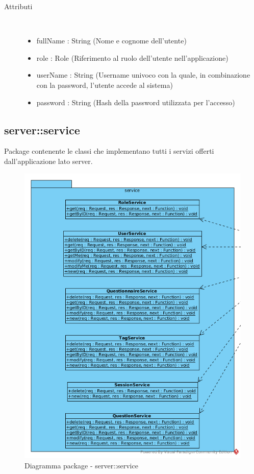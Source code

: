 \begin{description}
\item[Attributi] \hfill \\
 \vspace{-7mm}
\begin{itemize}
\item fullName : String (Nome e cognome dell'utente)
\item role : Role (Riferimento al ruolo dell'utente nell'applicazione)
\item userName : String (Username univoco con la quale, in combinazione con la password, l'utente accede al sistema)
\item password : String (Hash della password utilizzata per l'accesso)
\end{itemize}

\end{description}

\vspace{0.5cm}
\subsection{server::service}
Package contenente le classi che implementano tutti i servizi offerti dall'applicazione lato server.\begin{center}
		\begin{figure}[H]
			\centering \includegraphics[scale=4, max width=\textwidth, max height=\myheight]{../img/diagrammiClassi/server/service.png}
			\caption{Diagramma package - server::service}
		\end{figure}
	\end{center}\hypertarget{server::service::UserService}{}
